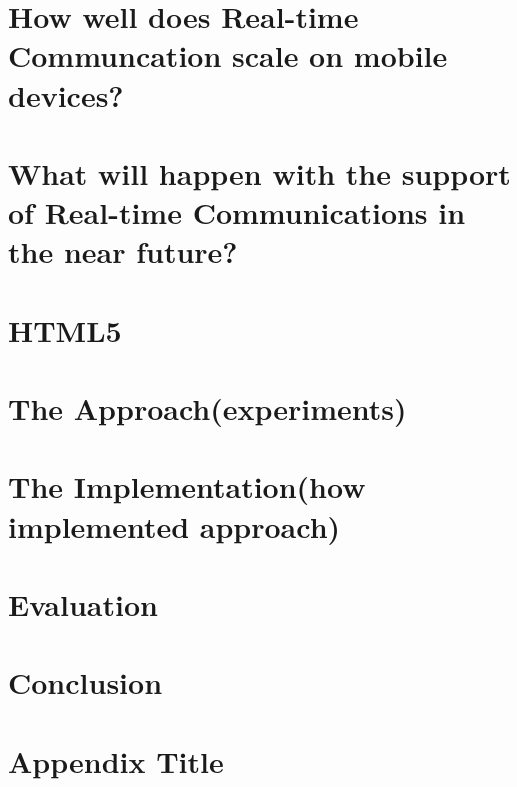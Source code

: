 \documentclass[11pt,a4paper]{report}
\begin{document}
\chapter{How well does Real-time Communcation scale on mobile devices?}

\chapter{What will happen with the support of Real-time Communications in the near future?}

\chapter{HTML5}

\chapter{The Approach(experiments)}%

\chapter{The Implementation(how implemented approach)}%

\chapter{Evaluation}%

\chapter{Conclusion}



\appendix
\chapter{Appendix Title}

\printglossaries
\end{document}
